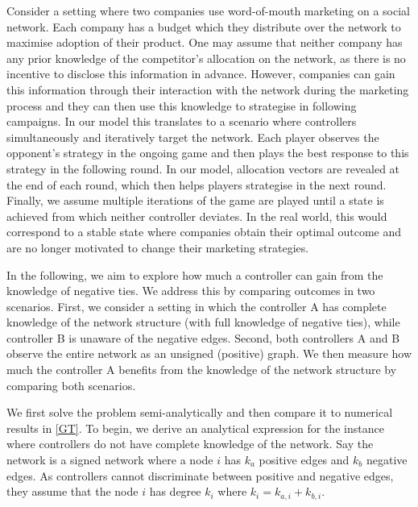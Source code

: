 Consider a setting where two companies use word-of-mouth marketing on a social network. Each company has a budget which they distribute over the network to maximise adoption of their product.
One may assume that neither company has any prior knowledge of the competitor's allocation on the network, as there is no incentive to disclose this information in advance. However, companies can gain this information through their interaction with the network during the marketing process and they can then use this knowledge to strategise in following campaigns.  
In our model this translates to a scenario where controllers simultaneously and iteratively target the network. Each player observes the opponent's strategy in the ongoing game and then plays the best response to this strategy in the following round. In our model, allocation vectors are revealed at the end of each round, which then helps players strategise in the next round.
Finally, we assume multiple iterations of the game are played until a state is achieved from which neither controller deviates. In the real world, this would correspond to a stable state where companies obtain their optimal outcome and are no longer motivated to change their marketing strategies.  

In the following, we aim to explore how much a controller can gain from the knowledge of negative ties. We address this by comparing outcomes in two scenarios. First, we consider a setting in which the controller A has complete knowledge of the network structure (with full knowledge of negative ties), while controller B is unaware of the negative edges. Second, both controllers A and B observe the entire network as an unsigned (positive) graph. We then measure how much the controller A benefits from the knowledge of the network structure by comparing both scenarios. 



We first solve the problem semi-analytically and then compare it to numerical results in \cref{GT}.  
To begin, we derive an analytical expression for the instance where controllers do not have complete knowledge of the network. Say the network is a signed network where a node $i$ has $k_{a}$ positive edges and $k_{b}$ negative edges. As controllers cannot discriminate between positive and negative edges, they assume that the node $i$ has degree $k_{i}$ where $k_{i}=k_{a,i}+k_{b,i}$. 

